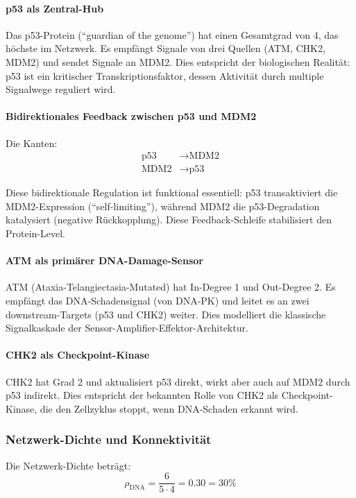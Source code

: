 ﻿\documentclass[a4paper,12pt]{article}
\theoremstyle{definition}
\begin{document}
\paragraph{p53 als Zentral-Hub}
Das p53-Protein (``guardian of the genome'') hat einen Gesamtgrad von 4, das höchste im Netzwerk. Es empfängt Signale von drei Quellen (ATM, CHK2, MDM2) und sendet Signale an MDM2. Dies entspricht der biologischen Realität: p53 ist ein kritischer Transkriptionsfaktor, dessen Aktivität durch multiple Signalwege reguliert wird.

\paragraph{Bidirektionales Feedback zwischen p53 und MDM2}
Die Kanten:
\begin{align*}
	\text{p53} &\rightarrow \text{MDM2} \\
	\text{MDM2} &\rightarrow \text{p53}
\end{align*}

Diese bidirektionale Regulation ist funktional essentiell: p53 transaktiviert die MDM2-Expression (``self-limiting''), während MDM2 die p53-Degradation katalysiert (negative Rückkopplung). Diese Feedback-Schleife stabilisiert den Protein-Level.

\paragraph{ATM als primärer DNA-Damage-Sensor}
ATM (Ataxia-Telangiectasia-Mutated) hat In-Degree 1 und Out-Degree 2. Es empfängt das DNA-Schadensignal (von DNA-PK) und leitet es an zwei downstream-Targets (p53 und CHK2) weiter. Dies modelliert die klassische Signalkaskade der Sensor-Amplifier-Effektor-Architektur.

\paragraph{CHK2 als Checkpoint-Kinase}
CHK2 hat Grad 2 und aktualisiert p53 direkt, wirkt aber auch auf MDM2 durch p53 indirekt. Dies entspricht der bekannten Rolle von CHK2 als Checkpoint-Kinase, die den Zellzyklus stoppt, wenn DNA-Schaden erkannt wird.

\subsubsection{Netzwerk-Dichte und Konnektivität}

Die Netzwerk-Dichte beträgt:
\[
\rho_{\text{DNA}} = \frac{6}{5 \cdot 4} = 0.30 = 30\%
\]
\end{document}
